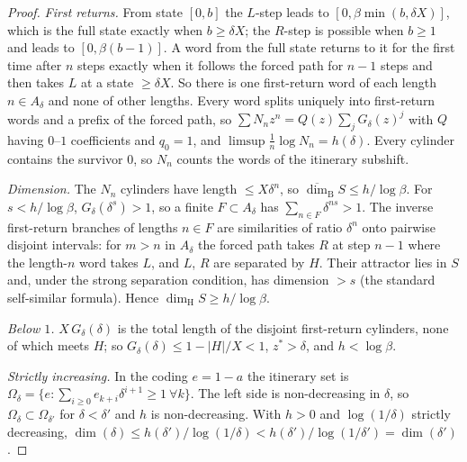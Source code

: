 \documentclass[11pt]{amsart}
\theoremstyle{remark}
\newcommand{\dimH}{\dim_{\mathrm H}}
\begin{document}
\begin{proof}
\emph{First returns.} From state $[0,b]$ the $L$-step leads to $[0,\beta\min(b,\delta X)]$, which is the full state exactly when $b\ge\delta X$; the $R$-step is possible when $b\ge1$ and leads to $[0,\beta(b-1)]$. A word from the full state returns to it for the first time after $n$ steps exactly when it follows the forced path for $n-1$ steps and then takes $L$ at a state $\ge\delta X$. So there is one first-return word of each length $n\in A_\delta$ and none of other lengths. Every word splits uniquely into first-return words and a prefix of the forced path, so $\sum N_nz^n=Q(z)\sum_j G_\delta(z)^j$ with $Q$ having $0$--$1$ coefficients and $q_0=1$, and $\limsup\frac1n\log N_n=h(\delta)$. Every cylinder contains the survivor $0$, so $N_n$ counts the words of the itinerary subshift.

\emph{Dimension.} The $N_n$ cylinders have length $\le X\delta^n$, so $\overline{\dim}_{\mathrm B}S\le h/\log\beta$. For $s<h/\log\beta$, $G_\delta(\delta^s)>1$, so a finite $F\subset A_\delta$ has $\sum_{n\in F}\delta^{ns}>1$. The inverse first-return branches of lengths $n\in F$ are similarities of ratio $\delta^n$ onto pairwise disjoint intervals: for $m>n$ in $A_\delta$ the forced path takes $R$ at step $n-1$ where the length-$n$ word takes $L$, and $L$, $R$ are separated by $H$. Their attractor lies in $S$ and, under the strong separation condition, has dimension $>s$ (the standard self-similar formula). Hence $\dimH S\ge h/\log\beta$.

\emph{Below $1$.} $X\,G_\delta(\delta)$ is the total length of the disjoint first-return cylinders, none of which meets $H$; so $G_\delta(\delta)\le1-|H|/X<1$, $z^*>\delta$, and $h<\log\beta$.

\emph{Strictly increasing.} In the coding $e=1-a$ the itinerary set is $\Omega_\delta=\{e:\sum_{i\ge0}e_{k+i}\delta^{i+1}\ge1\ \forall k\}$. The left side is non-decreasing in $\delta$, so $\Omega_\delta\subset\Omega_{\delta'}$ for $\delta<\delta'$ and $h$ is non-decreasing. With $h>0$ \cite{v1} and $\log(1/\delta)$ strictly decreasing, $\dim(\delta)\le h(\delta')/\log(1/\delta)<h(\delta')/\log(1/\delta')=\dim(\delta')$.


\end{proof}
\end{document}
